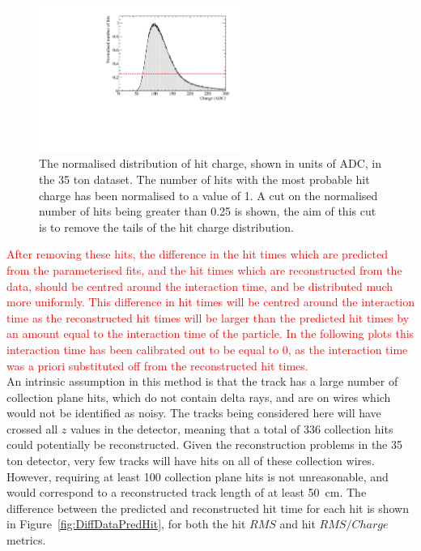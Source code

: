\begin{figure}
  \centering
  \includegraphics[width=0.6\textwidth]{ChargeCutData}
  \caption[The normalised distribution of hit charge in the 35 ton dataset]
          {The normalised distribution of hit charge, shown in units of ADC, in the 35 ton dataset. The number of hits with the most probable hit charge has been normalised to a value of 1. A cut on the normalised number of hits being greater than 0.25 is shown, the aim of this cut is to remove the tails of the hit charge distribution.}
  \label{fig:DiffData_ChargeCut}
\end{figure}

\textcolor{red}{After removing these hits, the difference in the hit times which are predicted from the parameterised fits, and the hit times which are reconstructed from the data, should be centred around the interaction time, and be distributed much more uniformly. This difference in hit times will be centred around the interaction time as the reconstructed hit times will be larger than the predicted hit times by an amount equal to the interaction time of the particle. In the following plots this interaction time has been calibrated out to be equal to 0, as the interaction time was a priori substituted off from the reconstructed hit times.} \\

An intrinsic assumption in this method is that the track has a large number of collection plane hits, which do not contain delta rays, and are on wires which would not be identified as noisy. The tracks being considered here will have crossed all $z$ values in the detector, meaning that a total of 336 collection hits could potentially be reconstructed. Given the reconstruction problems in the 35 ton detector, very few tracks will have hits on all of these collection wires. However, requiring at least 100 collection plane hits is not unreasonable, and would correspond to a reconstructed track length of at least 50~cm. The difference between the predicted and reconstructed hit time for each hit is shown in Figure~\ref{fig:DiffDataPredHit}, for both the hit $RMS$ and hit $RMS/Charge$ metrics. \\

